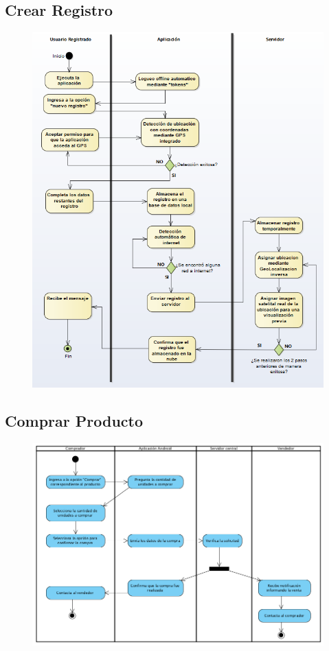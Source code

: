\subsection{Crear Registro }

\begin{figure}[H]
  \centering
    \includegraphics{imagenes/analisis/diagrama-actividad-crear-registro.png}
    \label{fig:diagrama-actividad-crear-tienda}
\end{figure}

\subsection{Comprar Producto}

\begin{figure}[H]
  \centering
    \includegraphics[width=1\textwidth]{imagenes/analisis/actividad-comprar-producto.png}
    \label{fig:diagrama-actividad-comprar-producto}
\end{figure}